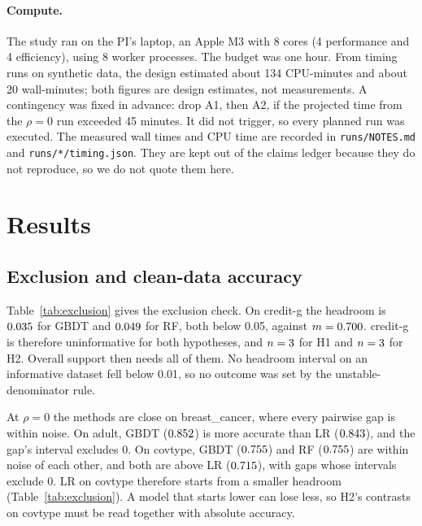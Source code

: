 \documentclass[11pt]{article}
\newcommand{\ds}[1]{\textsf{#1}}
\newcommand{\bc}{\ds{breast\_cancer}}
\newcommand{\cg}{\ds{credit-g}}
\newcommand{\ad}{\ds{adult}}
\newcommand{\ct}{\ds{covtype}}
\begin{document}
\paragraph{Compute.} The study ran on the PI's laptop, an Apple M3 with 8 cores (4
performance and 4 efficiency), using 8 worker processes. The budget was one hour. From timing
runs on synthetic data, the design estimated about 134 CPU-minutes and about 20
wall-minutes; both figures are design estimates, not measurements. A contingency was
fixed in advance: drop A1, then A2, if the projected time from the $\rho=0$ run exceeded 45
minutes. It did not trigger, so every planned run was executed. The measured wall times and CPU time are recorded in
\texttt{runs/NOTES.md} and \texttt{runs/*/timing.json}. They are kept out of the claims
ledger because they do not reproduce, so we do not quote them here.

\section{Results}
\label{sec:results}

\subsection{Exclusion and clean-data accuracy}

\begin{table}[!htbp]
\centering
\small

\caption{Exclusion check, decided from the $\rho=0$ cells only and before any noisy run.
For each dataset: the majority-class share $m$, $A(0)$ for each method (mean over 10 seeds)
and the headroom $h = A(0) - m$. A dataset is uninformative for a hypothesis if any compared
method's headroom is below 0.05 (asterisk). The whole dataset is then excluded, never a
single seed.}
\label{tab:exclusion}
\end{table}

Table~\ref{tab:exclusion} gives the exclusion check. On \cg{} the headroom is $0.035$ for
GBDT and $0.049$ for RF, both below 0.05, against $m = 0.700$. \cg{} is therefore
uninformative for both hypotheses, and $n = 3$ for H1 and $n = 3$ for H2.
Overall support then needs all \HOneNNeed{} of them. No headroom interval on an informative
dataset fell below 0.01, so no outcome was set by the unstable-denominator rule.

At $\rho=0$ the methods are close on \bc, where every pairwise gap is within noise. On \ad,
GBDT ($0.852$) is more accurate than LR ($0.843$), and the gap's interval
excludes 0. On \ct, GBDT ($0.755$) and RF ($0.755$) are within noise of each
other, and both are above LR ($0.715$), with gaps whose intervals exclude 0. LR on \ct{} therefore starts from a
smaller headroom (Table~\ref{tab:exclusion}). A model that starts lower can lose less, so
H2's contrasts on \ct{} must be read together with absolute accuracy.
\end{document}
